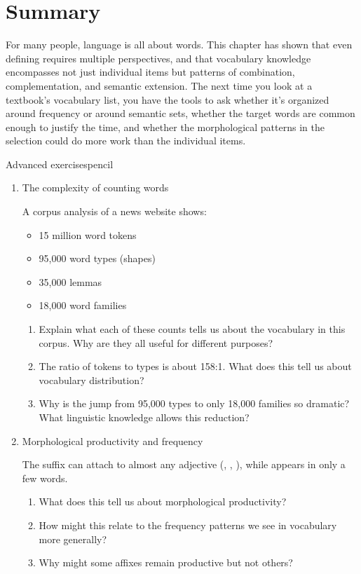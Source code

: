 \section{Summary}

For many people, language is all about words. This chapter has shown that even defining  requires multiple perspectives, and that vocabulary knowledge encompasses not just individual items but patterns of combination, complementation, and semantic extension. The next time you look at a textbook's vocabulary list, you have the tools to ask whether it's organized around frequency or around semantic sets, whether the target words are common enough to justify the time, and whether the morphological patterns in the selection could do more work than the individual items.

\begin{tblsframedsymbol}{Advanced exercises}{pencil}
\begin{enumerate}[noitemsep, leftmargin=*]
    \item The complexity of counting words

    A corpus analysis of a news website shows:
    \begin{itemize}[nosep]
        \item 15 million word tokens
        \item 95,000 word types (shapes)
        \item 35,000 lemmas
        \item 18,000 word families
    \end{itemize}

    \begin{enumerate}[nosep]
        \item Explain what each of these counts tells us about the vocabulary in this corpus. Why are they all useful for different purposes?
        \item The ratio of tokens to types is about 158:1. What does this tell us about vocabulary distribution?
        \item Why is the jump from 95,000 types to only 18,000 families so dramatic? What linguistic knowledge allows this reduction?
    \end{enumerate}

    \item Morphological productivity and frequency

    The suffix  can attach to almost any adjective (, , ), while  appears in only a few words.
    \begin{enumerate}[nosep]
        \item What does this tell us about morphological productivity?
        \item How might this relate to the frequency patterns we see in vocabulary more generally?
        \item Why might some affixes remain productive but not others?
    \end{enumerate}


\end{enumerate}
\end{tblsframedsymbol}
